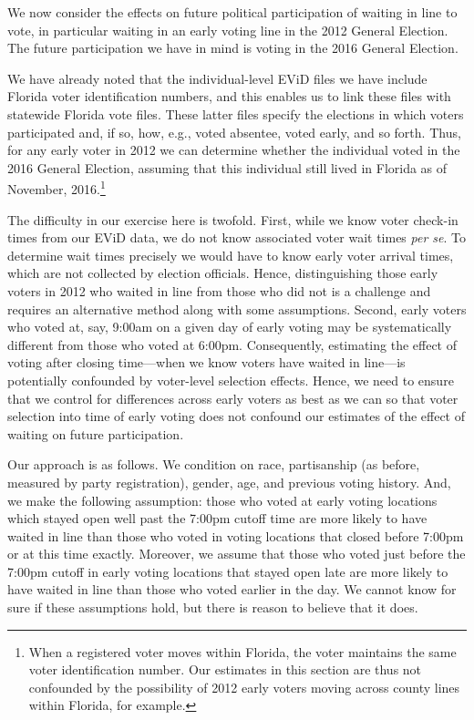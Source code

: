\documentclass[12pt,titlepage]{article}
\begin{document}
We now consider the effects on future political participation of
waiting in line to vote, in particular waiting in an early voting line
in the 2012 General Election.  The future participation we have in
mind is voting in the 2016 General Election.

We have already noted that the individual-level EViD files we have
include Florida voter identification numbers, and this enables us to
link these files with statewide Florida vote files.  These latter
files specify the elections in which voters participated and, if so,
how, e.g., voted absentee, voted early, and so forth.  Thus, for any
early voter in 2012 we can determine whether the individual voted in
the 2016 General Election, assuming that this individual still lived
in Florida as of November, 2016.\footnote{When a registered voter
  moves within Florida, the voter maintains the same voter
  identification number.  Our estimates in this section are thus not
  confounded by the possibility of 2012 early voters moving across
  county lines within Florida, for example.}  

The difficulty in our exercise here is twofold.  First, while we know
voter check-in times from our EViD data, we do not know associated
voter wait times \emph{per se}.  To determine wait times precisely we
would have to know early voter arrival times, which are not collected
by election officials.  Hence, distinguishing those early voters in
2012 who waited in line from those who did not is a challenge and
requires an alternative method along with some assumptions.  Second,
early voters who voted at, say, 9:00am on a given day of early voting
may be systematically different from those who voted at
6:00pm. Consequently, estimating the effect of voting after closing
time---when we know voters have waited in line---is potentially
confounded by voter-level selection effects.  Hence, we need to ensure
that we control for differences across early voters as best as we can
so that voter selection into time of early voting does not confound
our estimates of the effect of waiting on future participation.

Our approach is as follows.  We condition on race, partisanship (as
before, measured by party registration), gender, age, and previous
voting history.  And, we make the following assumption: those who
voted at early voting locations which stayed open well past the 7:00pm
cutoff time are more likely to have waited in line than those who
voted in voting locations that closed before 7:00pm or at this time
exactly.  Moreover, we assume that those who voted just before the
7:00pm cutoff in early voting locations that stayed open late are more
likely to have waited in line than those who voted earlier in the day.
We cannot know for sure if these assumptions hold, but there is reason
to believe that it does.
\end{document}
